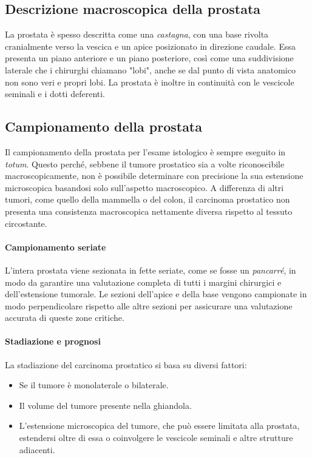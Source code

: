\subsection{Descrizione macroscopica della prostata}
La prostata è spesso descritta come una \textit{castagna}, con una base rivolta cranialmente verso la vescica e un apice posizionato in direzione caudale. Essa presenta un piano anteriore e un piano posteriore, così come una suddivisione laterale che i chirurghi chiamano "lobi", anche se dal punto di vista anatomico non sono veri e propri lobi. La prostata è inoltre in continuità con le vescicole seminali e i dotti deferenti.

\subsection{Campionamento della prostata}
Il campionamento della prostata per l'esame istologico è sempre eseguito in \textit{totum}. Questo perché, sebbene il tumore prostatico sia a volte riconoscibile macroscopicamente, non è possibile determinare con precisione la sua estensione microscopica basandosi solo sull'aspetto macroscopico. A differenza di altri tumori, come quello della mammella o del colon, il carcinoma prostatico non presenta una consistenza macroscopica nettamente diversa rispetto al tessuto circostante.

\paragraph{Campionamento seriate}
L'intera prostata viene sezionata in fette seriate, come se fosse un \textit{pancarré}, in modo da garantire una valutazione completa di tutti i margini chirurgici e dell'estensione tumorale. Le sezioni dell'apice e della base vengono campionate in modo perpendicolare rispetto alle altre sezioni per assicurare una valutazione accurata di queste zone critiche. 

\paragraph{Stadiazione e prognosi}
La stadiazione del carcinoma prostatico si basa su diversi fattori: 
\begin{itemize}
    \item Se il tumore è monolaterale o bilaterale.
    \item Il volume del tumore presente nella ghiandola.
    \item L'estensione microscopica del tumore, che può essere limitata alla prostata, estendersi oltre di essa o coinvolgere le vescicole seminali e altre strutture adiacenti.
\end{itemize}

